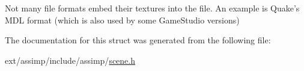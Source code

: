 Not many file formats embed their textures into the file. An example is Quake's M\-D\-L format (which is also used by some Game\-Studio versions) 

The documentation for this struct was generated from the following file\-:\begin{DoxyCompactItemize}
\item 
ext/assimp/include/assimp/\hyperlink{scene_8h}{scene.\-h}\end{DoxyCompactItemize}
